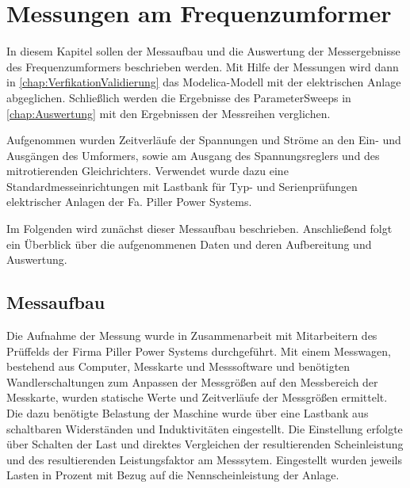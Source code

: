\chapter{Messungen am Frequenzumformer}
\label{chap:Versuch}
In diesem Kapitel sollen der Messaufbau und die Auswertung der Messergebnisse des Frequenzumformers beschrieben werden. Mit Hilfe der Messungen wird dann in \cref{chap:VerfikationValidierung} das Modelica-Modell mit der elektrischen Anlage abgeglichen. Schließlich werden die Ergebnisse des ParameterSweeps in \cref{chap:Auswertung} mit den Ergebnissen der Messreihen verglichen. 

Aufgenommen wurden Zeitverläufe der Spannungen und Ströme an den Ein- und Ausgängen des Umformers, sowie am Ausgang des Spannungsreglers und des mitrotierenden Gleichrichters. Verwendet wurde dazu eine Standardmesseinrichtungen mit Lastbank für Typ- und Serienprüfungen elektrischer Anlagen der Fa. Piller Power Systems. 

Im Folgenden wird zunächst dieser Messaufbau beschrieben. Anschließend folgt ein Überblick über die aufgenommenen Daten und deren Aufbereitung und Auswertung.

\section{Messaufbau}
\label{sec:Messaufbau}
Die Aufnahme der Messung wurde in Zusammenarbeit mit Mitarbeitern des Prüffelds der Firma Piller Power Systems durchgeführt. Mit einem Messwagen, bestehend aus Computer, Messkarte und Messsoftware und benötigten Wandlerschaltungen zum Anpassen der Messgrößen auf den Messbereich der Messkarte, wurden statische Werte und Zeitverläufe der Messgrößen ermittelt. Die dazu benötigte Belastung der Maschine wurde über eine Lastbank aus schaltbaren Widerständen und Induktivitäten eingestellt. Die Einstellung erfolgte über Schalten der Last und direktes Vergleichen der resultierenden Scheinleistung und des resultierenden Leistungsfaktor am Messsytem. Eingestellt wurden jeweils Lasten in Prozent mit Bezug auf die Nennscheinleistung der Anlage. 

